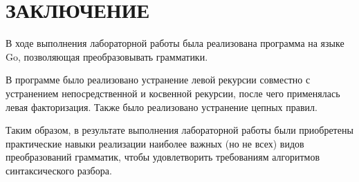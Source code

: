 \chapter*{ЗАКЛЮЧЕНИЕ}

В ходе выполнения лабораторной работы была реализована программа
на языке Go, позволяющая преобразовывать грамматики.

В программе было реализовано устранение левой рекурсии совместно с
устранением непосредственной и косвенной рекурсии, после чего
применялась левая факторизация. Также было реализовано устранение
цепных правил.

Таким образом, в результате выполнения лабораторной работы были
приобретены практические навыки реализации наиболее важных (но не всех)
видов преобразований грамматик, чтобы удовлетворить требованиям
алгоритмов синтаксического разбора.